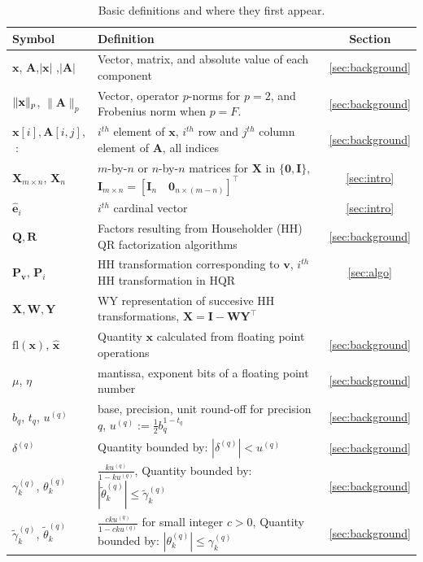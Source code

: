 \documentclass[review,onefignum,onetabnum]{siamart190516}
\newcommand{\dd}{\delta}
\newcommand{\tth}{\theta}
\newcommand{\bb}[1]{\mathbf{#1}}
\newcommand{\fl}{\mathrm{fl}}
\begin{document}
\begin{table}[H]
	\centering
	\begin{tabular}{|m{}|m{10.6cm}|c|}
		\hline
		Symbol & Definition & Section \\ \hline
		${\bb x}$, ${\bb A}$,$|\bb{x}|$ ,$|\bb{A}|$  & Vector, matrix, and absolute value of each component  & \ref{sec:background} \\
		$\|{\bf x}\|_p$, $\|\bb{A}\|_p$ & Vector, operator $p$-norms for $p=2$, and Frobenius norm when $p=F$. & \ref{sec:background}\\
		$\bb{x}[i], \bb{A}[i,j]$,$\;:$& $i^{th}$ element of $\bb{x}$, $i^{th}$ row and $j^{th}$ column element of $\bb{A}$, all indices& \ref{sec:background}\\
		$\bb{X}_{m\times n}$, $\bb{X}_{n}$ & $m$-by-$n$ or $n$-by-$n$ matrices for $\bb{X}$ in $\{\bb{0},\bb{I}\}$, $\bb{I}_{m\times n}=[\bb{I}_{n} \quad \bb{0}_{n \times (m-n)}]^{\top}$ &  \ref{sec:intro}\\
		$\hat{\bb{e}}_i$  & $i^{th}$ cardinal vector &  \ref{sec:intro}\\
		\hline
		$\bb{Q},\bb{R}$  & Factors resulting from Householder (HH) QR factorization algorithms  & \ref{sec:background}\\
		$\bb{P}_{\bb{v}}$, $\bb{P}_i$ & HH transformation corresponding to $\bb{v}$, $i^{th}$ HH transformation in HQR& \ref{sec:algo}\\
		$\bb{X}, \bb{W}, \bb{Y}$ & WY representation of succesive HH transformations, $\bb{X}=\bb{I}-\bb{W}\bb{Y}^{\top}$ & \\
		\hline
		$\fl(\bb{x})$, $\hat{\bb{x}}$ & Quantity $\bb{x}$ calculated from floating point operations & \ref{sec:background} \\
		$\mu$, $\eta$  & mantissa, exponent bits of a floating point number & \ref{sec:background} \\
		$b_q$, $t_q$, $u^{(q)}$ & base, precision, unit round-off for precision $q$,  $u^{(q)}:=\frac{1}{2}b_q^{1-t_q}$& \ref{sec:background}\\
		$\dd^{(q)}$ &Quantity bounded by: $|\dd^{(q)}| < u^{(q)}$ &  \ref{sec:background} \\
		$\gamma^{(q)}_{k}$,  $\tth^{(q)}_{k}$& $\frac{ku^{(q)}}{1-ku^{(q)}}$, Quantity bounded by: $|\tilde{\tth}^{(q)}_{k}|\leq\tilde{\gamma}^{(q)}_{k}$ &  \ref{sec:background} \\
		$\tilde{\gamma}^{(q)}_{k}$,  $\tilde{\tth}^{(q)}_{k}$& $\frac{cku^{(q)}}{1-cku^{(q)}}$ for small integer $c>0$, Quantity bounded by: $|\tth^{(q)}_{k}|\leq\gamma^{(q)}_{k}$ &  \ref{sec:background} \\
		\hline
	\end{tabular}
	\caption{Basic definitions and where they first appear.}
	\label{table:notation}
\end{table}
\end{document}

